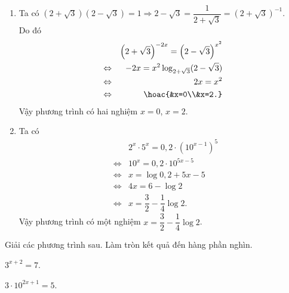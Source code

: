 \begin{ex}
{\begin{enumerate}
\begin{eqnarray*}
				&\Leftrightarrow& x^2+(2-\log_5 2)x+(\log_5 2 -3)=0  \\
				&\Leftrightarrow& \hoac{&x=1\\&x=-3+\log_5  2.}
			\end{eqnarray*}
			 Vậy phương trình có hai nghiệm $x=1$, $x=-3+\log_5 2$.
			 \item
			Ta  có $(2+\sqrt{3})(2-\sqrt{3})=1 \Rightarrow 2-\sqrt{3}=\dfrac{1}{2+\sqrt{3}}=(2+\sqrt{3})^{-1}$.\\
			Do  đó
			\begin{eqnarray*}
				&&\left(2+\sqrt{3}\right)^{-2x}=\left(2-\sqrt{3}\right)^{x^2} \\ &\Leftrightarrow& -2x=x^2\log_{2+\sqrt{3}} (2-\sqrt{3}) \\ 
				&\Leftrightarrow& 2x=x^2 \\ 
				&\Leftrightarrow& \hoac{&x=0\\&x=2.}\\ 
			\end{eqnarray*}
			Vậy phương trình có hai nghiệm $x=0$, $x=2$. 
			 \item Ta có
			\begin{eqnarray*}
				&&2^x\cdot  5^x=0{,}2\cdot \left(10^{x-1}\right)^5 \\
				&\Leftrightarrow& 10^x=0{,}2\cdot  10^{5x-5}\\
				&\Leftrightarrow&  x=\log 0{,}2 +5x-5\\
				&\Leftrightarrow& 4x=6-\log  2\\
				&\Leftrightarrow& x=\dfrac{3}{2}-\dfrac{1}{4}\log  2.
			\end{eqnarray*}
			Vậy phương  trình có một nghiệm $x=\dfrac{3}{2}-\dfrac{1}{4}\log 2$.
		\end{enumerate}
	} 
\end{ex}

\begin{bt}%
	Giải các phương trình sau. Làm tròn kết quả đến hàng phần nghìn.
	\begin{listEX}[2]
		\item  $3^{x+2}=7$.
		\item $3\cdot 10^{2x+1}=5$.
	\end{listEX}
\end{bt}

